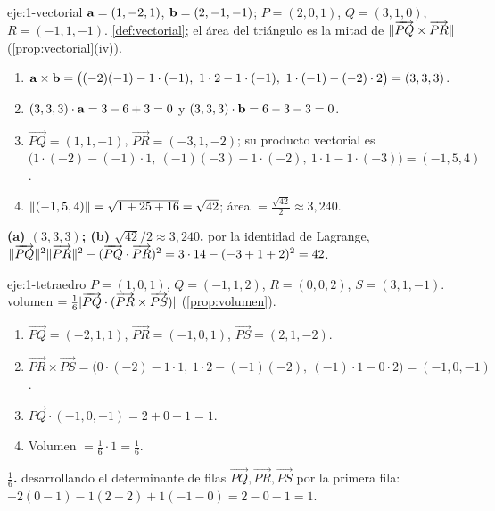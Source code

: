 \begin{solucion}{eje:1-vectorial}
\datos $\mathbf{a}=(1,-2,1)$, $\mathbf{b}=(2,-1,-1)$; $P=(2,0,1)$, $Q=(3,1,0)$, $R=(-1,1,-1)$.
\planteamiento \cref{def:vectorial}; el área del triángulo es la mitad de $\lVert\overrightarrow{PQ}\times\overrightarrow{PR}\rVert$ (\cref{prop:vectorial}(iv)).
\pasos
\begin{enumerate}[label=\arabic*.]
  \item $\va\times\vb=\bigl((-2)(-1)-1\cdot(-1),\ 1\cdot2-1\cdot(-1),\ 1\cdot(-1)-(-2)\cdot2\bigr)=(3,3,3)$.
  \item $(3,3,3)\cdot\mathbf{a}=3-6+3=0$ y $(3,3,3)\cdot\mathbf{b}=6-3-3=0$.
  \item $\overrightarrow{PQ}=(1,1,-1)$, $\overrightarrow{PR}=(-3,1,-2)$; su producto vectorial es $\bigl(1\cdot(-2)-(-1)\cdot1,\ (-1)(-3)-1\cdot(-2),\ 1\cdot1-1\cdot(-3)\bigr)=(-1,5,4)$.
  \item $\lVert(-1,5,4)\rVert=\sqrt{1+25+16}=\sqrt{42}$; área $=\frac{\sqrt{42}}{2}\approx3{,}240$.
\end{enumerate}
\resultado \textbf{(a) $(3,3,3)$; (b) $\sqrt{42}/2\approx3{,}240$.}
\comprobacion por la identidad de Lagrange, $\lVert\overrightarrow{PQ}\rVert^2\lVert\overrightarrow{PR}\rVert^2-(\overrightarrow{PQ}\cdot\overrightarrow{PR})^2=3\cdot14-(-3+1+2)^2=42$.
\end{solucion}

\begin{solucion}{eje:1-tetraedro}
\datos $P=(1,0,1)$, $Q=(-1,1,2)$, $R=(0,0,2)$, $S=(3,1,-1)$.
\planteamiento volumen $=\frac16\lvert\overrightarrow{PQ}\cdot(\overrightarrow{PR}\times\overrightarrow{PS})\rvert$ (\cref{prop:volumen}).
\pasos
\begin{enumerate}[label=\arabic*.]
  \item $\overrightarrow{PQ}=(-2,1,1)$, $\overrightarrow{PR}=(-1,0,1)$, $\overrightarrow{PS}=(2,1,-2)$.
  \item $\overrightarrow{PR}\times\overrightarrow{PS}=\bigl(0\cdot(-2)-1\cdot1,\ 1\cdot2-(-1)(-2),\ (-1)\cdot1-0\cdot2\bigr)=(-1,0,-1)$.
  \item $\overrightarrow{PQ}\cdot(-1,0,-1)=2+0-1=1$.
  \item Volumen $=\frac16\cdot1=\frac16$.
\end{enumerate}
\resultado \textbf{$\frac16$.}
\comprobacion desarrollando el determinante de filas $\overrightarrow{PQ},\overrightarrow{PR},\overrightarrow{PS}$ por la primera fila: $-2(0-1)-1(2-2)+1(-1-0)=2-0-1=1$.
\end{solucion}

